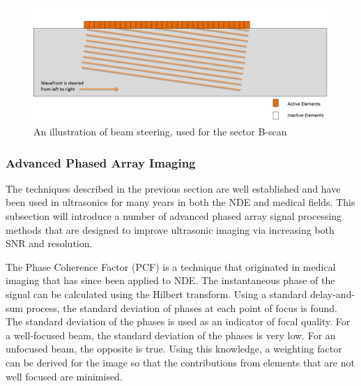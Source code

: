 \begin{figure}[htbp]
\centering
		\includegraphics[width=\textwidth]{SectorB.png}
		\caption{An illustration of beam steering, used for the sector B-scan}
		\label{fig:SectorB}
\end{figure}

\subsubsection{Advanced Phased Array Imaging}\label{sec:advanced_pa_imaging}

The techniques described in the previous section are well established and have been used in ultrasonics for many years in both the NDE and medical fields. This subsection will introduce a number of advanced phased array signal processing methods that are designed to improve ultrasonic imaging via increasing both SNR and resolution.

The Phase Coherence Factor (PCF) is a technique that originated in medical imaging\cite{camacho_phase_2009} that has since been applied to NDE\cite{camacho_phase_2011}. The instantaneous phase of the signal can be calculated using the Hilbert transform. Using a standard delay-and-sum process, the standard deviation of phases at each point of focus is found. The standard deviation of the phases is used as an indicator of focal quality. For a well-focused beam, the standard deviation of the phases is very low. For an unfocused beam, the opposite is true. Using this knowledge, a weighting factor can be derived for the image so that the contributions from elements that are not well focused are minimised.

